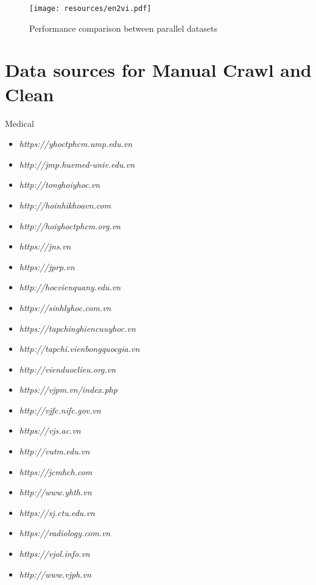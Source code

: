 \documentclass[11pt]{article}
\begin{document}
\begin{figure}[ht!]
    \centering
    \texttt{[image: resources/en2vi.pdf]}
    \caption{Performance comparison between parallel datasets}
    \label{fig:bitext_quality}
\end{figure}


\section{Data sources for Manual Crawl and Clean}
\label{app:source}





Medical
\begin{itemize}
\color{darkblue}
\item \textsl{https://yhoctphcm.ump.edu.vn}
\item \textsl{http://jmp.huemed-univ.edu.vn}
\item \textsl{http://tonghoiyhoc.vn}
\item \textsl{http://hoinhikhoavn.com}
\item \textsl{http://hoiyhoctphcm.org.vn}
\item \textsl{https://jns.vn}
\item \textsl{https://jprp.vn}
\item \textsl{http://hocvienquany.edu.vn}
\item \textsl{https://sinhlyhoc.com.vn}
\item \textsl{https://tapchinghiencuuyhoc.vn}
\item \textsl{http://tapchi.vienbongquocgia.vn}
\item \textsl{http://vienduoclieu.org.vn}
\item \textsl{https://vjpm.vn/index.php}
\item \textsl{http://vjfc.nifc.gov.vn}
\item \textsl{https://vjs.ac.vn}
\item \textsl{http://vutm.edu.vn}
\item \textsl{https://jcmhch.com}
\item \textsl{http://www.yhth.vn}
\item \textsl{https://sj.ctu.edu.vn}
\item \textsl{https://radiology.com.vn}
\item \textsl{https://vjol.info.vn}
\item \textsl{http://www.vjph.vn}
  
\end{itemize}
\end{document}
